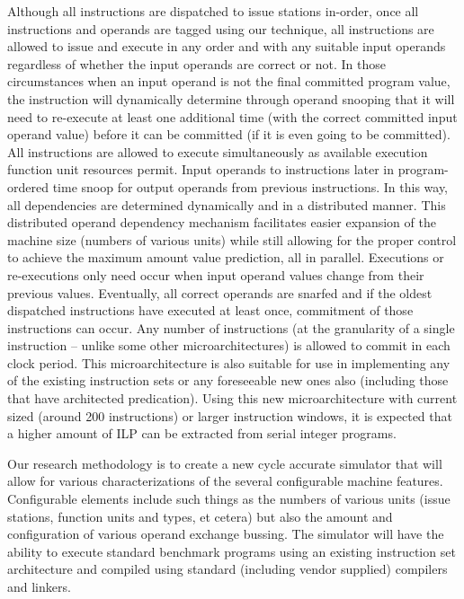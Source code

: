 \documentclass[10pt,twocolumn,dvips]{article}
\begin{document}
Although all instructions are dispatched to issue stations in-order,
once all instructions and operands are tagged using our technique, all
instructions are allowed to issue and execute in any order and with any
suitable input operands regardless of whether 
the input operands are correct or not.  
In those circumstances when an input operand is not the final
committed program value, the instruction will dynamically determine
through operand snooping that it will need to re-execute at least one
additional time (with the correct committed input operand value) before
it can be committed (if it is even going to be committed).
All instructions are allowed to execute simultaneously as available
execution function unit resources permit.  
Input operands to instructions later in
program-ordered time snoop for output operands from previous
instructions.  In this way, all dependencies are determined
dynamically and in a distributed manner.
This distributed operand dependency mechanism facilitates
easier expansion of the machine size (numbers of various units) 
while still allowing for the proper control to achieve the
maximum amount value prediction, all in parallel.
Executions or re-executions only need occur when input
operand values change from their previous values.  
Eventually, all correct operands
are snarfed and if the oldest dispatched instructions have executed at
least once, commitment of those instructions can occur.  
Any number of instructions (at the granularity of a single
instruction -- unlike some other microarchitectures) 
is allowed to commit in each clock period.
This microarchitecture is also suitable for use in implementing
any of the existing instruction sets or any foreseeable new
ones also (including those that have architected predication).
Using this new microarchitecture with current sized (around 200 instructions)
or larger instruction windows, it is expected that 
a higher amount of ILP can be extracted
from serial integer programs.

Our research methodology is to create a new cycle accurate simulator
that will allow for various characterizations
of the several configurable machine features.  Configurable
elements include such things as the numbers of various units 
(issue stations, function units and types, et cetera) but also
the amount and configuration of various operand exchange bussing.
The simulator will have the ability to execute standard benchmark
programs using an existing instruction set architecture and
compiled using standard (including vendor supplied) compilers
and linkers.
%
%
%
%
\end{document}
